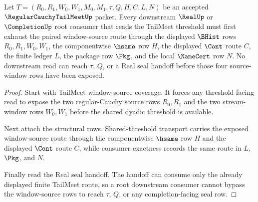 \begin{theorem}
\label{thm:regular-cauchy-tail-meet-root-downstream-window-exhaustion}
Let $T=(R_0,R_1,W_0,W_1,M_0,M_1,\tau,Q,H,C,L,N)$ be an accepted
$\RegularCauchyTailMeetUp$ packet. Every downstream $\RealUp$ or
$\CompletionUp$ root consumer that reads the TailMeet threshold must first
exhaust the paired window-source route through the displayed $\BHist$ rows
$R_0,R_1,W_0,W_1$, the componentwise $\hsame$ row $H$, the displayed $\Cont$
route $C$, the finite ledger $L$, the package row $\Pkg$, and the local
$\NameCert$ row $N$. No downstream read can reach $\tau$, $Q$, or a Real seal
handoff before those four source-window rows have been exposed.
\end{theorem}
\begin{proof}
Start with TailMeet window-source coverage. It forces any threshold-facing read
to expose the two regular-Cauchy source rows $R_0,R_1$ and the two stream-window
rows $W_0,W_1$ before the shared dyadic threshold is available.

Next attach the structural rows. Shared-threshold transport carries the exposed
window-source route through the componentwise $\hsame$ row $H$ and the displayed
$\Cont$ route $C$, while consumer exactness records the same route in $L$,
$\Pkg$, and $N$.

Finally read the Real seal handoff. The handoff can consume only the already
displayed finite TailMeet route, so a root downstream consumer cannot bypass the
window-source rows to reach $\tau$, $Q$, or any completion-facing seal row.
\end{proof}


